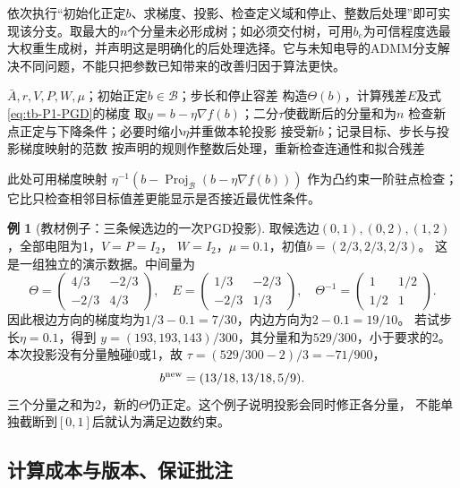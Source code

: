 \documentclass[UTF8,11pt,fontset=fandol,openany,oneside]{ctexbook}
\theoremstyle{definition}
\newtheorem{example}[theorem]{例}
\theoremstyle{remark}
\numberwithin{equation}{chapter}
\begin{document}
依次执行“初始化正定$b$、求梯度、投影、检查定义域和停止、整数后处理”即可实现该分支。取最大的$n$个分量未必形成树；如必须交付树，可用$b_e$为可信程度选最大权重生成树，并声明这是明确化的后处理选择。它与未知电导的ADMM分支解决不同问题，不能只把参数已知带来的改善归因于算法更快。


\begin{algorithm}[htbp]
\caption{P1已知电阻分支：投影梯度与教材的定义域检查}
\label{alg:tb-P1-PGD}
\begin{algorithmic}[1]
\Require $\bar A,r,V,P,W,\mu$；初始正定$b\in\mathcal B$；步长和停止容差
\Repeat
 \State 构造$\Theta(b)$，计算残差$E$及式\eqref{eq:tb-P1-PGD}的梯度
 \State 取$y=b-\eta\nabla f(b)$；二分$\tau$使截断后的分量和为$n$
 \State 检查新点正定与下降条件；必要时缩小$\eta$并重做本轮投影
 \State 接受新$b$；记录目标、步长与投影梯度映射的范数
\State 按声明的规则作整数后处理，重新检查连通性和拟合残差
\end{algorithmic}
\end{algorithm}
此处可用梯度映射
$\eta^{-1}(b-\operatorname{Proj}_{\mathcal B}(b-\eta\nabla f(b)))$
作为凸约束一阶驻点检查；它比只检查相邻目标值差更能显示是否接近最优性条件。

\begin{example}[教材例子：三条候选边的一次PGD投影]
取候选边$(0,1),(0,2),(1,2)$，全部电阻为1，$V=P=I_2$，
$W=I_2$，$\mu=0.1$，初值$b=(2/3,2/3,2/3)$。
这是一组独立的演示数据。中间量为
\[
 \Theta=\begin{pmatrix}4/3&-2/3\\-2/3&4/3\end{pmatrix},\quad
 E=\begin{pmatrix}1/3&-2/3\\-2/3&1/3\end{pmatrix},\quad
 \Theta^{-1}=\begin{pmatrix}1&1/2\\1/2&1\end{pmatrix}.
\]
因此根边方向的梯度均为$1/3-0.1=7/30$，内边方向为$2-0.1=19/10$。
若试步长$\eta=0.1$，得到
$y=(193,193,143)/300$，其分量和为$529/300$，小于要求的2。
本次投影没有分量触碰0或1，故
$\tau=(529/300-2)/3=-71/900$，
\[
 b^{\rm new}=(13/18,13/18,5/9).
\]
三个分量之和为2，新的$\Theta$仍正定。这个例子说明投影会同时修正各分量，
不能单独截断到$[0,1]$后就认为满足边数约束。
\end{example}

\subsection{计算成本与版本、保证批注}
\end{document}
